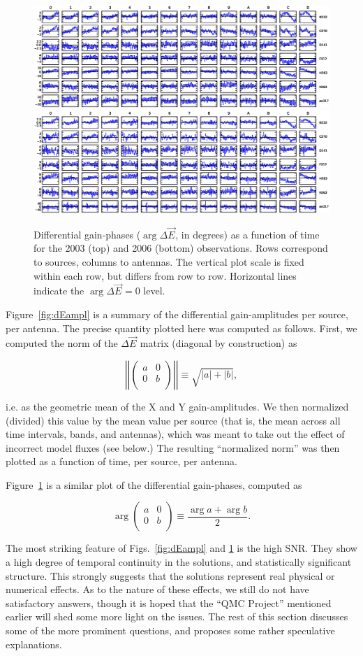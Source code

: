 \documentclass[]{aa}
\newcommand{\matrixtt}[4]{\left( \begin{array}{cc}#1&#2\\#3&#4\\\end{array} \right)}
\newcommand{\jones}[2]{\vec {#1}_{#2}}
\begin{document}
\begin{figure}
\sidecaption
\parbox[b]{12cm}{
\includegraphics[width=12cm]{o2003_dEphase_mean}
\includegraphics[width=12cm]{o2006_dEphase_mean}
}
\caption{\label{fig:dEphase}Differential gain-phases ($\arg\Delta\jones{E}{}$, in degrees) as a function of time for the 2003 (top) and 2006 (bottom) observations. Rows correspond to sources, columns to antennas. The vertical plot scale is fixed within each row, but differs from row to row. Horizontal lines indicate the $\arg\Delta\jones{E}{}=0$ level.}
\end{figure}

Figure~\ref{fig:dEampl} is a summary of the differential gain-amplitudes per source, per antenna. The precise quantity plotted here was computed as follows. First, we computed the norm of the $\Delta\jones{E}{}$ matrix (diagonal by construction) as 

\[
\left|\left|\matrixtt{a}{0}{0}{b}\right|\right| \equiv \sqrt{|a|+|b|},
\]

i.e. as the geometric mean of the X and Y gain-amplitudes. We then normalized (divided) this value by the mean value per source (that is, the mean across all time intervals, bands, and antennas), which was meant to take out the effect of incorrect model fluxes (see below.) The resulting ``normalized norm'' was then plotted as a function of time, per source, per antenna.

Figure~\ref{fig:dEphase} is a similar plot of the differential gain-phases, computed as

\[
\arg\matrixtt{a}{0}{0}{b} \equiv \frac{\arg a + \arg b}{2}.
\]

The most striking feature of Figs.~\ref{fig:dEampl} and \ref{fig:dEphase} is the high SNR. They show a high degree of temporal continuity in the solutions, and statistically significant structure. This strongly suggests that the solutions represent real physical or numerical effects. As to the nature of these effects, we still do not have satisfactory answers, though it is hoped that the ``QMC Project'' \citep{QMC} mentioned earlier will shed some more light on the issues. The rest of this section discusses some of the more prominent questions, and proposes some rather speculative explanations.
 
\end{document}
